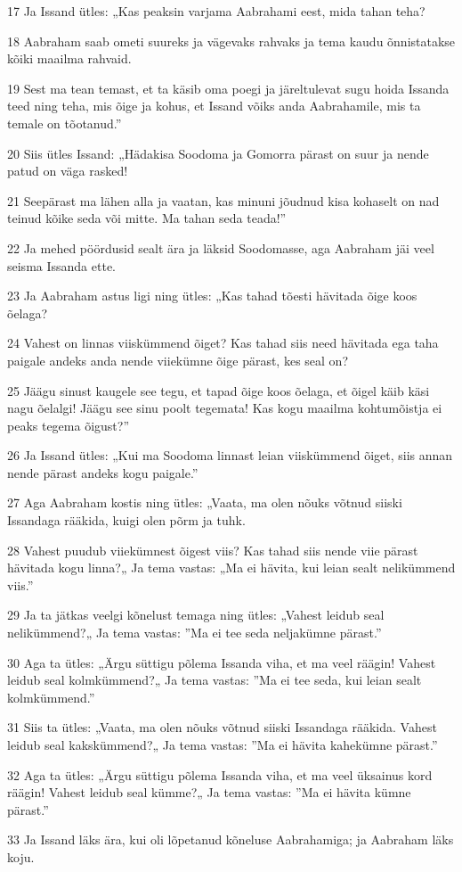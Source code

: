 \par 17 Ja Issand ütles: „Kas peaksin varjama Aabrahami eest, mida tahan teha?
\par 18 Aabraham saab ometi suureks ja vägevaks rahvaks ja tema kaudu õnnistatakse kõiki maailma rahvaid.
\par 19 Sest ma tean temast, et ta käsib oma poegi ja järeltulevat sugu hoida Issanda teed ning teha, mis õige ja kohus, et Issand võiks anda Aabrahamile, mis ta temale on tõotanud.”
\par 20 Siis ütles Issand: „Hädakisa Soodoma ja Gomorra pärast on suur ja nende patud on väga rasked!
\par 21 Seepärast ma lähen alla ja vaatan, kas minuni jõudnud kisa kohaselt on nad teinud kõike seda või mitte. Ma tahan seda teada!”
\par 22 Ja mehed pöördusid sealt ära ja läksid Soodomasse, aga Aabraham jäi veel seisma Issanda ette.
\par 23 Ja Aabraham astus ligi ning ütles: „Kas tahad tõesti hävitada õige koos õelaga?
\par 24 Vahest on linnas viiskümmend õiget? Kas tahad siis need hävitada ega taha paigale andeks anda nende viiekümne õige pärast, kes seal on?
\par 25 Jäägu sinust kaugele see tegu, et tapad õige koos õelaga, et õigel käib käsi nagu õelalgi! Jäägu see sinu poolt tegemata! Kas kogu maailma kohtumõistja ei peaks tegema õigust?”
\par 26 Ja Issand ütles: „Kui ma Soodoma linnast leian viiskümmend õiget, siis annan nende pärast andeks kogu paigale.”
\par 27 Aga Aabraham kostis ning ütles: „Vaata, ma olen nõuks võtnud siiski Issandaga rääkida, kuigi olen põrm ja tuhk.
\par 28 Vahest puudub viiekümnest õigest viis? Kas tahad siis nende viie pärast hävitada kogu linna?„ Ja tema vastas: „Ma ei hävita, kui leian sealt nelikümmend viis.”
\par 29 Ja ta jätkas veelgi kõnelust temaga ning ütles: „Vahest leidub seal nelikümmend?„ Ja tema vastas: ”Ma ei tee seda neljakümne pärast.”
\par 30 Aga ta ütles: „Ärgu süttigu põlema Issanda viha, et ma veel räägin! Vahest leidub seal kolmkümmend?„ Ja tema vastas: ”Ma ei tee seda, kui leian sealt kolmkümmend.”
\par 31 Siis ta ütles: „Vaata, ma olen nõuks võtnud siiski Issandaga rääkida. Vahest leidub seal kakskümmend?„ Ja tema vastas: ”Ma ei hävita kahekümne pärast.”
\par 32 Aga ta ütles: „Ärgu süttigu põlema Issanda viha, et ma veel üksainus kord räägin! Vahest leidub seal kümme?„ Ja tema vastas: ”Ma ei hävita kümne pärast.”
\par 33 Ja Issand läks ära, kui oli lõpetanud kõneluse Aabrahamiga; ja Aabraham läks koju.


